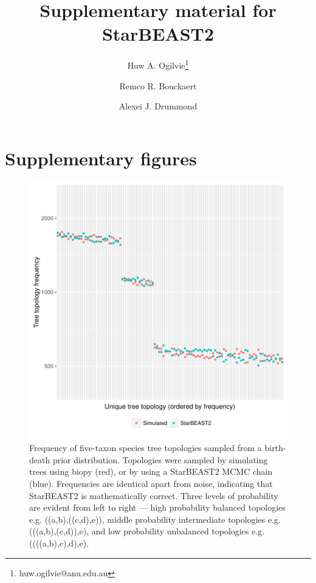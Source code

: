 \documentclass[12pt]{article}
\begin{document}
\title{Supplementary material for StarBEAST2}
\author[1,2]{Huw A. Ogilvie\thanks{huw.ogilvie@anu.edu.au}}
\author[2,3]{Remco R. Bouckaert}
\author[2,3]{Alexei J. Drummond}

\maketitle

\clearpage

\section{Supplementary figures}

\justifying

\begin{figure}[htb!]
\centering
\includegraphics[width=16cm]{species_topology_frequencies.pdf}
\caption
{Frequency of five-taxon species tree topologies sampled from a birth-death prior
distribution. Topologies were sampled by simulating trees using biopy (red), or
by using a StarBEAST2 MCMC chain (blue). Frequencies are identical apart from
noise, indicating that StarBEAST2 is mathematically correct. Three levels of
probability are evident from left to right --- high probability balanced
topologies e.g. ((a,b),((c,d),e)), middle probability intermediate topologies
e.g. (((a,b),(c,d)),e), and low probability unbalanced topologies e.g.
((((a,b),c),d),e).}
\label{fig:speciesTopologyFrequencies}
\end{figure}
\end{document}

